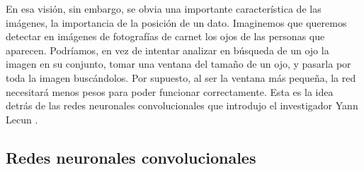 En esa visión, sin embargo, se obvia una importante característica de las imágenes, la importancia de la posición de un dato. Imaginemos que queremos detectar en imágenes de fotografías de carnet los ojos de las personas que aparecen. Podríamos, en vez de intentar analizar en búsqueda de un ojo la imagen en su conjunto, tomar una ventana del tamaño de un ojo, y pasarla por toda la imagen buscándolos. Por supuesto, al ser la ventana más pequeña, la red necesitará menos pesos para poder funcionar correctamente. Esta es la idea detrás de las redes neuronales convolucionales que introdujo el investigador Yann Lecun \cite{lecun-89e}\cite{lecun-98}.\\ 

\subsection{Redes neuronales convolucionales}


